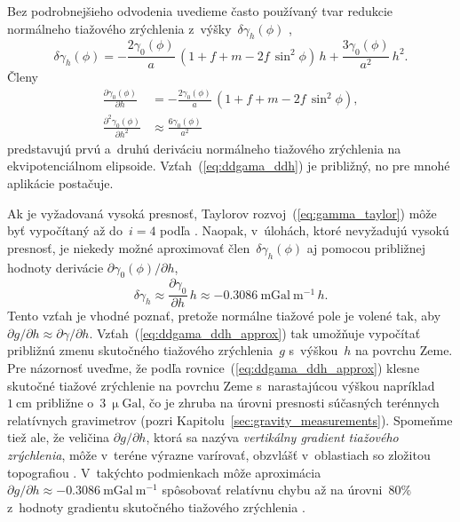 \documentclass[a4paper, 12pt]{book}
\begin{document}
Bez podrobnejšieho odvodenia uvedieme často používaný tvar redukcie normálneho 
tiažového zrýchlenia z~výšky~$\delta\gamma_h(\phi)$ \parencite[pozri 
napríklad][]{MoritzPhysicalGeodesy},
%
\begin{equation}
\delta\gamma_h(\phi) = -\frac{2\gamma_0(\phi)}{a} \, (1 + f + m - 2f \, 
\sin^2\phi) \, h + \frac{3\gamma_0(\phi)}{a^2} \, h^2{.}
\end{equation}
%
Členy
%
\begin{align}
\frac{\partial \gamma_0(\phi)}{\partial h} &= -\frac{2\gamma_0(\phi)}{a} \, (1 
+ f + m - 2f \, \sin^2\phi){,}\\
%
%
\label{eq:ddgama_ddh}
\frac{\partial^2 \gamma_0(\phi)}{\partial h^2} &\approx 
\frac{6\gamma_0(\phi)}{a^2}
\end{align}
%
predstavujú prvú a~druhú deriváciu normálneho tiažového zrýchlenia na 
ekvipotenciálnom elipsoide.  Vzťah~(\ref{eq:ddgama_ddh}) je približný, no pre 
mnohé aplikácie postačuje.

Ak je vyžadovaná vysoká presnosť, Taylorov rozvoj~(\ref{eq:gamma_taylor}) môže 
byť vypočítaný až do~$i = 4$ podľa \textcite{Pick2000}.  Naopak, v~úlohách, 
ktoré nevyžadujú vysokú presnosť, je niekedy možné aproximovať 
člen~$\delta\gamma_h(\phi)$ aj pomocou približnej hodnoty derivácie $\partial 
\gamma_0(\phi) \slash \partial h$,
%
\begin{equation}
\label{eq:ddgama_ddh_approx}
\delta\gamma_h \approx \frac{\partial \gamma_0}{\partial h} \, h \approx 
-0.3086 \ \mathrm{mGal} \ \mathrm{m}^{-1} \, h{.}
\end{equation}
%
Tento vzťah je vhodné poznať, pretože normálne tiažové pole je volené tak, aby 
$\partial g \slash \partial h \approx \partial \gamma \slash \partial h$.  
Vzťah~(\ref{eq:ddgama_ddh_approx}) tak umožňuje vypočítať približnú zmenu 
skutočného tiažového zrýchlenia~$g$ s~výškou~$h$ na povrchu Zeme.  Pre 
názornosť uveďme, že podľa rovnice~(\ref{eq:ddgama_ddh_approx}) klesne skutočné 
tiažové zrýchlenie na povrchu Zeme s~narastajúcou výškou napríklad~$1 
\ \mathrm{cm}$ približne o~$3 \ \upmu\mathrm{Gal}$, čo je zhruba na úrovni 
presnosti súčasných terénnych relatívnych gravimetrov (pozri 
Kapitolu~\ref{sec:gravity_measurements}).  Spomeňme tiež ale, že veličina 
$\partial g \slash \partial h$, ktorá sa nazýva \emph{vertikálny gradient 
tiažového zrýchlenia}, môže v~teréne výrazne varírovať, obzvlášť v~oblastiach 
so zložitou topografiou \parencite{Zahorec2018}.  V~takýchto podmienkach môže 
aproximácia~$\partial g \slash \partial h \approx -0.3086 \ \mathrm{mGal} 
\ \mathrm{m}^{-1}$ spôsobovať relatívnu chybu až na úrovni~$80 \%$ z~hodnoty 
gradientu skutočného tiažového zrýchlenia \parencite{Vajda2020a}.
\end{document}
